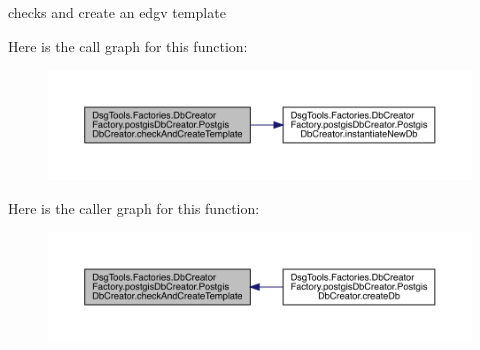 \begin{DoxyVerb}checks and create an edgv template
\end{DoxyVerb}
 Here is the call graph for this function\+:
\nopagebreak
\begin{figure}[H]
\begin{center}
\leavevmode
\includegraphics[width=350pt]{class_dsg_tools_1_1_factories_1_1_db_creator_factory_1_1postgis_db_creator_1_1_postgis_db_creator_a2fbc730b348c20d45c1a31e77fd04ff6_cgraph}
\end{center}
\end{figure}
Here is the caller graph for this function\+:
\nopagebreak
\begin{figure}[H]
\begin{center}
\leavevmode
\includegraphics[width=350pt]{class_dsg_tools_1_1_factories_1_1_db_creator_factory_1_1postgis_db_creator_1_1_postgis_db_creator_a2fbc730b348c20d45c1a31e77fd04ff6_icgraph}
\end{center}
\end{figure}
\mbox{\label{class_dsg_tools_1_1_factories_1_1_db_creator_factory_1_1postgis_db_creator_1_1_postgis_db_creator_a651236665f823f015e669345182f60dc}} 
